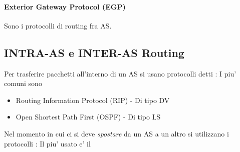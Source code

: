 \paragraph{Exterior Gateway Protocol (EGP)} Sono i protocolli di routing fra AS.
\subsection{INTRA-AS e INTER-AS Routing}
Per trasferire pacchetti all'interno di un AS si usano protocolli detti : I piu' comuni sono
\begin{itemize}
    \item Routing Information Protocol (RIP) - Di tipo DV
    \item Open Shortest Path First (OSPF) - Di tipo LS
\end{itemize}
Nel momento in cui ci si deve \textit{spostare} da un AS a un altro si utilizzano i protocolli : Il piu' usato e' il 
